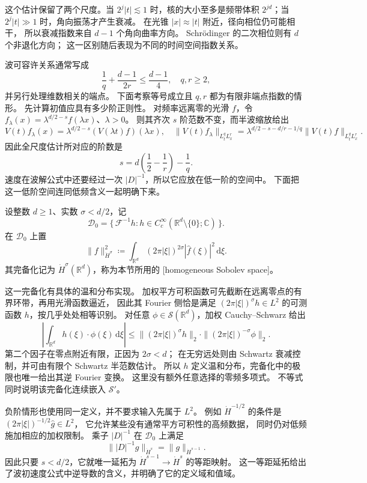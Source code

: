 这个估计保留了两个尺度。当 \(2^j|t|\lesssim1\) 时，核的大小至多是频带体积
\(2^{jd}\)；当 \(2^j|t|\gg1\) 时，角向振荡才产生衰减。
在光锥 \(|x|\approx|t|\) 附近，径向相位仍可能相干，
所以衰减指数来自 \(d-1\) 个角向曲率方向。
Schrödinger 的二次相位则有 \(d\) 个非退化方向；
这一区别随后表现为不同的时间空间指数关系。

\ProseParagraphBreak
波可容许关系通常写成
\[
 \frac1q+\frac{d-1}{2r}\le\frac{d-1}{4},
 \quad q,r\ge2,
\]
并另行处理维数相关的端点。
下面考察等号成立且 \(q,r\) 都为有限非端点指数的情形。
先计算初值应具有多少阶正则性。
对频率远离零的光滑 \(f\)，令
\(f_\lambda(x)=\lambda^{d/2-s}f(\lambda x)\)、\(\lambda>0\)。
则其齐次 \(s\) 阶范数不变，而半波缩放给出
\[
 V(t)f_\lambda(x)
 =\lambda^{d/2-s}(V(\lambda t)f)(\lambda x),
 \quad
 \|V(t)f_\lambda\|_{L^q_tL^r_x}
 =\lambda^{d/2-s-d/r-1/q}\|V(t)f\|_{L^q_tL^r_x}.
\]
因此全尺度估计所对应的阶数是
\[
 s=d\left(\frac12-\frac1r\right)-\frac1q.
\]
速度在波解公式中还要经过一次 \(|D|^{-1}\)，所以它应放在低一阶的空间中。
下面把这一低阶空间连同低频含义一起明确下来。

\begin{definition}\label{b2:def:E-homogeneous-data}
设整数 \(d\ge1\)、实数 \(\sigma<d/2\)，记
\[
 \mathcal D_0=
 \{\,\mathcal F^{-1}h:h\in C_c^\infty(\mathbb R^d\setminus\{0\};\mathbb C)\,\}.
\]
在 \(\mathcal D_0\) 上置
\[
 \|f\|_{\dot H^\sigma}^2
 \coloneqq\int_{\mathbb R^d}
       (2\pi|\xi|)^{2\sigma}|\widehat f(\xi)|^2\,\mathrm d\xi.
\]
其完备化记为 \(\dot H^\sigma(\mathbb R^d)\)，称为本节所用的
[homogeneous Sobolev space]。
\end{definition}
这一完备化有具体的温和分布实现。
加权平方可积函数可先截断在远离零点的有界环带，再用光滑函数逼近，
因此其 Fourier 侧恰是满足
\((2\pi|\xi|)^\sigma h\in L^2\) 的可测函数 \(h\)，按几乎处处相等识别。
对任意 \(\phi\in\mathcal S(\mathbb R^d)\)，加权 Cauchy--Schwarz 给出
\[
 \left|\int_{\mathbb R^d}h(\xi)\cdot\phi(\xi)\,\mathrm d\xi\right|
 \le\|(2\pi|\xi|)^\sigma h\|_2
       \cdot\|(2\pi|\xi|)^{-\sigma}\phi\|_2.
\]
第二个因子在零点附近有限，正因为 \(2\sigma<d\)；
在无穷远处则由 Schwartz 衰减控制，并可由有限个 Schwartz 半范数估计。
所以 \(h\) 定义温和分布，完备化中的极限也唯一给出其逆 Fourier 变换。
这里没有额外任意选择的零频多项式。
不等式同时说明该完备化连续嵌入 \(\mathcal S'\)。

\ProseParagraphBreak
负阶情形也使用同一定义，并不要求输入先属于 \(L^2\)。
例如 \(\dot H^{-1/2}\) 的条件是
\((2\pi|\xi|)^{-1/2}\widehat g\in L^2\)，
它允许某些没有通常平方可积性的高频数据，
同时仍对低频施加相应的加权限制。
乘子 \(|D|^{-1}\) 在 \(\mathcal D_0\) 上满足
\[
 \||D|^{-1}g\|_{\dot H^s}=\|g\|_{\dot H^{s-1}}.
\]
因此只要 \(s<d/2\)，它就唯一延拓为
\(\dot H^{s-1}\to\dot H^s\) 的等距映射。
这一等距延拓给出了波初速度公式中逆导数的含义，并明确了它的定义域和值域。

